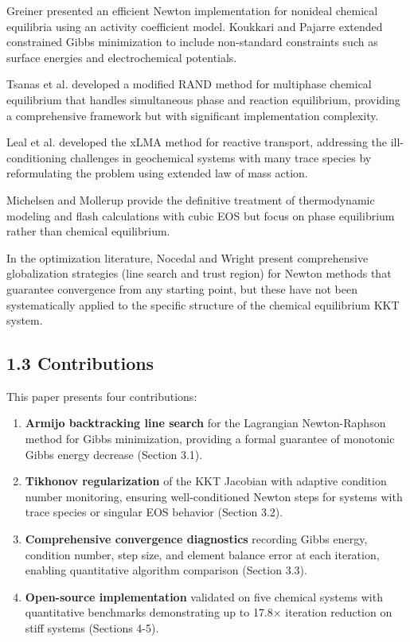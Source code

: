 \documentclass[review,3p]{elsarticle}
\begin{document}
Greiner \citep{Greiner1991} presented an efficient Newton implementation for nonideal chemical equilibria using an activity coefficient model. Koukkari and Pajarre \citep{Koukkari2006} extended constrained Gibbs minimization to include non-standard constraints such as surface energies and electrochemical potentials.

Tsanas et al. \citep{Tsanas2018} developed a modified RAND method for multiphase chemical equilibrium that handles simultaneous phase and reaction equilibrium, providing a comprehensive framework but with significant implementation complexity.

Leal et al. \citep{Leal2016} developed the xLMA method for reactive transport, addressing the ill-conditioning challenges in geochemical systems with many trace species by reformulating the problem using extended law of mass action.

Michelsen and Mollerup \citep{Michelsen2007} provide the definitive treatment of thermodynamic modeling and flash calculations with cubic EOS but focus on phase equilibrium rather than chemical equilibrium.

In the optimization literature, Nocedal and Wright \citep{NocedalWright2006} present comprehensive globalization strategies (line search and trust region) for Newton methods that guarantee convergence from any starting point, but these have not been systematically applied to the specific structure of the chemical equilibrium KKT system.

\subsection{1.3 Contributions}

This paper presents four contributions:

\begin{enumerate}
  \item \textbf{Armijo backtracking line search} for the Lagrangian Newton-Raphson method for Gibbs minimization, providing a formal guarantee of monotonic Gibbs energy decrease (Section 3.1).
  \item \textbf{Tikhonov regularization} of the KKT Jacobian with adaptive condition number monitoring, ensuring well-conditioned Newton steps for systems with trace species or singular EOS behavior (Section 3.2).
  \item \textbf{Comprehensive convergence diagnostics} recording Gibbs energy, condition number, step size, and element balance error at each iteration, enabling quantitative algorithm comparison (Section 3.3).
  \item \textbf{Open-source implementation} validated on five chemical systems with quantitative benchmarks demonstrating up to 17.8$\times$ iteration reduction on stiff systems (Sections 4-5).
\end{enumerate}
\end{document}
